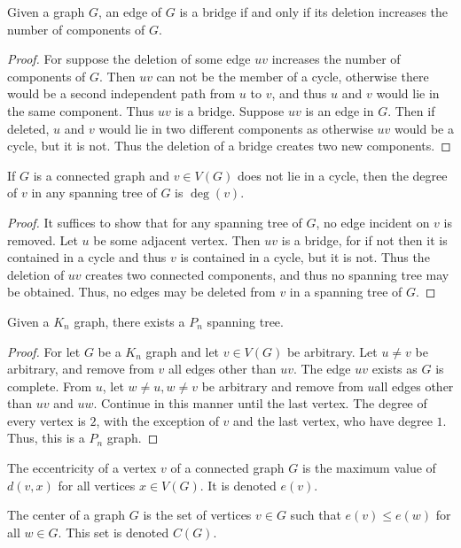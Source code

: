 \documentclass[crop=false,class=book]{standalone}
\begin{document}
\begin{theorem}
Given a graph $G$, an edge of $G$ is a bridge if and only if its deletion increases the number of components of $G$.
\end{theorem}
\begin{proof}
For suppose the deletion of some edge $uv$ increases the number of components of $G$. Then $uv$ can not be the member of a cycle, otherwise there would be a second independent path from $u$ to $v$, and thus $u$ and $v$ would lie in the same component. Thus $uv$ is a bridge. Suppose $uv$ is an edge in $G$. Then if deleted, $u$ and $v$ would lie in two different components as otherwise $uv$ would be a cycle, but it is not. Thus the deletion of a bridge creates two new components.
\end{proof}
\begin{corollary}
If $G$ is a connected graph and $v\in V(G)$ does not lie in a cycle, then the degree of $v$ in any spanning tree of $G$ is $\deg(v)$.
\end{corollary}
\begin{proof}
It suffices to show that for any spanning tree of $G$, no edge incident on $v$ is removed. Let $u$ be some adjacent vertex. Then $uv$ is a bridge, for if not then it is contained in a cycle and thus $v$ is contained in a cycle, but it is not. Thus the deletion of $uv$ creates two connected components, and thus no spanning tree may be obtained. Thus, no edges may be deleted from $v$ in a spanning tree of $G$.
\end{proof}
\begin{theorem}
Given a $K_n$ graph, there exists a $P_n$ spanning tree.
\end{theorem}
\begin{proof}
For let $G$ be a $K_n$ graph and let $v\in V(G)$ be arbitrary. Let $u\ne v$ be arbitrary, and remove from $v$ all edges other than $uv$. The edge $uv$ exists as $G$ is complete. From $u$, let $w\ne u, w\ne v$ be arbitrary and remove from $u$all edges other than $uv$ and $uw$. Continue in this manner until the last vertex. The degree of every vertex is $2$, with the exception of $v$ and the last vertex, who have degree $1$. Thus, this is a $P_n$ graph.
\end{proof}
\begin{definition}
The eccentricity of a vertex $v$ of a connected graph $G$ is the maximum value of $d(v,x)$ for all vertices $x\in V(G)$. It is denoted $e(v)$.
\end{definition}
\begin{definition}
The center of a graph $G$ is the set of vertices $v\in G$ such that $e(v) \leq e(w)$ for all $w\in G$. This set is denoted $C(G)$.
\end{definition}
\end{document}

